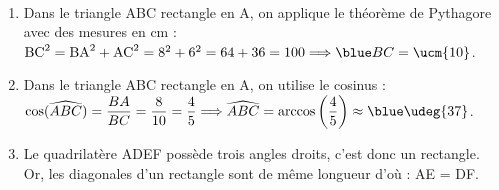 \ \\ [-5mm]
   \begin{enumerate}
      \item Dans le triangle ABC rectangle en A, on applique le théorème de Pythagore avec des mesures en cm : \\
         $\text{BC}^2=\text{BA}^2+\text{AC}^2 =8^2+6^2 =64+36 =100 \Longrightarrow {\blue BC = \ucm{10}}$.
   \item Dans le triangle ABC rectangle en A, on utilise le cosinus : \\ [1mm]
      $\cos(\widehat{ABC}) =\dfrac{BA}{BC} =\dfrac{8}{10} =\dfrac45 \Longrightarrow \widehat{ABC} =\arccos\left(\dfrac45\right) \approx {\blue \udeg{37}}$. \smallskip
   \item Le quadrilatère ADEF possède trois angles droits, c'est donc un rectangle. Or, les diagonales d'un rectangle sont de même longueur d'où :
      {\blue AE = DF}.
   \end{enumerate}
